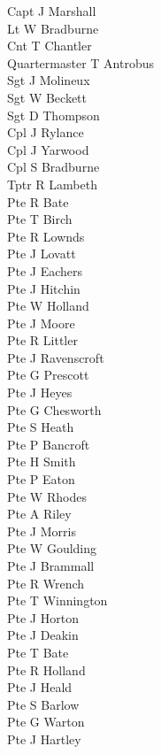 \begin{multicols}{2}
  \noindent
  Capt J Marshall \\
  Lt W Bradburne \\
  Cnt T Chantler \\
  Quartermaster T Antrobus \\
  Sgt J Molineux \\
  Sgt W Beckett \\
  Sgt D Thompson \\
  Cpl J Rylance \\
  Cpl J Yarwood \\
  Cpl S Bradburne \\
  Tptr R Lambeth \\
  Pte R Bate \\
  Pte T Birch \\
  Pte R Lownds \\
  Pte J Lovatt \\
  Pte J Eachers \\
  Pte J Hitchin \\
  Pte W Holland \\
  Pte J Moore \\
  Pte R Littler \\
  Pte J Ravenscroft \\
  Pte G Prescott \\
  Pte J Heyes \\
  Pte G Chesworth \\
  Pte S Heath \\
  Pte P Bancroft \\
  Pte H Smith \\
  Pte P Eaton \\
  Pte W Rhodes \\
  Pte A Riley \\
  Pte J Morris \\
  Pte W Goulding \\
  Pte J Brammall \\
  Pte R Wrench \\
  Pte T Winnington \\
  Pte J Horton \\
  Pte J Deakin \\
  Pte T Bate \\
  Pte R Holland \\
  Pte J Heald \\
  Pte S Barlow \\
  Pte G Warton \\
  Pte J Hartley \\
\end{multicols}

